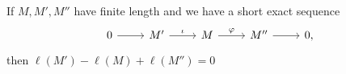 If $M, M', M''$ have finite length and we have a short exact sequence
\[\begin{tikzcd}
0 \arrow[r] & M' \arrow[r, "\iota"] & M \arrow[r, "\varphi"] & M'' \arrow[r] & 0,
\end{tikzcd}\]
then  $\ell(M') - \ell(M) + \ell(M'') = 0$
